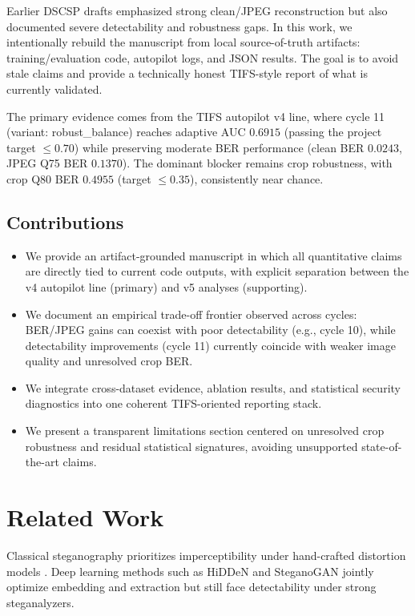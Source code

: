 \documentclass[journal]{IEEEtran}
\begin{document}
Earlier DSCSP drafts emphasized strong clean/JPEG reconstruction but also documented severe detectability and robustness gaps. In this work, we intentionally rebuild the manuscript from local source-of-truth artifacts: training/evaluation code, autopilot logs, and JSON results. The goal is to avoid stale claims and provide a technically honest TIFS-style report of what is currently validated.

The primary evidence comes from the TIFS autopilot v4 line, where cycle 11 (variant: robust\_balance) reaches adaptive AUC $0.6915$ (passing the project target $\leq 0.70$) while preserving moderate BER performance (clean BER $0.0243$, JPEG Q75 BER $0.1370$). The dominant blocker remains crop robustness, with crop Q80 BER $0.4955$ (target $\leq 0.35$), consistently near chance.

\subsection{Contributions}
\begin{itemize}
\item We provide an artifact-grounded manuscript in which all quantitative claims are directly tied to current code outputs, with explicit separation between the v4 autopilot line (primary) and v5 analyses (supporting).
\item We document an empirical trade-off frontier observed across cycles: BER/JPEG gains can coexist with poor detectability (e.g., cycle 10), while detectability improvements (cycle 11) currently coincide with weaker image quality and unresolved crop BER.
\item We integrate cross-dataset evidence, ablation results, and statistical security diagnostics into one coherent TIFS-oriented reporting stack.
\item We present a transparent limitations section centered on unresolved crop robustness and residual statistical signatures, avoiding unsupported state-of-the-art claims.
\end{itemize}

\section{Related Work}
Classical steganography prioritizes imperceptibility under hand-crafted distortion models \cite{cox2007digital,pevny2010using,holub2012designing,holub2014universal}. Deep learning methods such as HiDDeN and SteganoGAN \cite{zhu2018hidden,zhang2019steganogan} jointly optimize embedding and extraction but still face detectability under strong steganalyzers.
\end{document}
